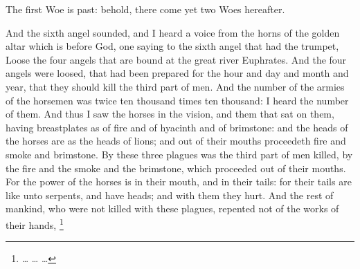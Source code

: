  The first Woe is past: behold, there come yet two Woes hereafter.

 And the sixth angel sounded, and I heard a voice from the horns of the golden altar which is before God,%
 one saying to the sixth angel that had the trumpet, Loose the four angels that are bound at the great river Euphrates. 
 And the four angels were loosed, that had been prepared for the hour and day and month and year, that they should kill the third part of men. 
 And the number of the armies of the horsemen was twice ten thousand times ten thousand: I heard the number of them. 
 And thus I saw the horses in the vision, and them that sat on them, having breastplates as of fire and of hyacinth and of brimstone: and the heads of the horses are as the heads of lions; and out of their mouths proceedeth fire and smoke and brimstone.%
 By these three plagues was the third part of men killed, by the fire and the smoke and the brimstone, which proceeded out of their mouths. 
 For the power of the horses is in their mouth, and in their tails: for their tails are like unto serpents, and have heads; and with them they hurt. 
 And the rest of mankind, who were not killed with these plagues, repented not of the works of their hands,%
	\footnote{%
		\ldots%
		\ldots%
		\ldots%
	}

